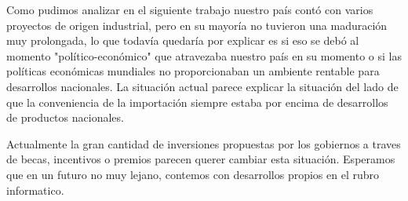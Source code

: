 \documentclass[%
 	final,
%
	notitlepage,
	narroweqnarray,
	inline,
 	twoside,
	]{ieee}
\begin{document}
Como pudimos analizar en el siguiente trabajo nuestro pa\'is cont\'o con varios proyectos de origen industrial, pero en su mayor\'ia no tuvieron una maduraci\'on muy prolongada, lo que todav\'ia quedar\'ia por explicar es si eso se deb\'o al momento "pol\'itico-econ\'omico" que atravezaba nuestro pa\'is en su momento o si las pol\'iticas econ\'omicas mundiales no proporcionaban un ambiente rentable para desarrollos nacionales. La situaci\'on actual parece explicar la situaci\'on del lado de que la conveniencia de la importaci\'on siempre estaba por encima de desarrollos de productos nacionales.

Actualmente la gran cantidad de inversiones propuestas por los gobiernos a traves de becas, incentivos o premios parecen querer cambiar esta situaci\'on. Esperamos que en un futuro no muy lejano, contemos con desarrollos propios en el rubro informatico.
\end{document}

